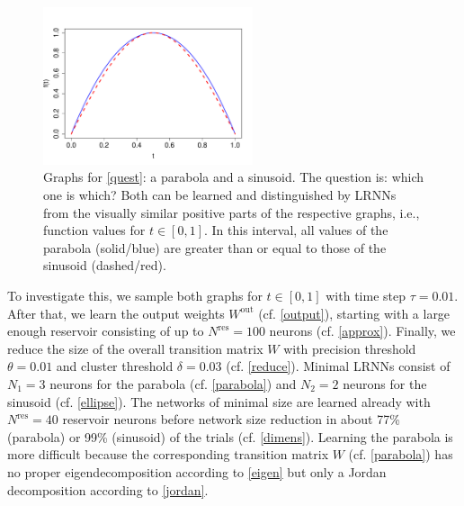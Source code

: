 \documentclass[twoside,11pt]{article}
\theoremstyle{definition}
\begin{document}
\begin{figure}
        \centering
	\includegraphics[width=0.55\textwidth]{fig/parasin2} %
	\caption{Graphs for \cref{quest}: a parabola and a sinusoid.
	The question is: which one is which? Both can be learned and
	distinguished by LRNNs from the visually similar positive parts of the
	respective graphs, i.e., function values for $t \in [0, 1]$. In this
	interval, all values of the parabola (solid/blue) are greater than or equal
	to those of the sinusoid (dashed/red).}
	\label{parasin}
\end{figure}

To investigate this, we sample both graphs for $t \in [0,1]$ with time step
$\tau=0.01$. After that, we learn the output weights $W^\mathrm{out}$ (cf.
\cref{output}), starting with a large enough reservoir consisting of up to
$N^\mathrm{res} = 100$ neurons (cf. \cref{approx}). Finally, we reduce the
size of the overall transition matrix $W$ with precision threshold $\theta =
0.01$ and cluster threshold $\delta = 0.03$ (cf. \cref{reduce}). Minimal LRNNs consist of $N_1 = 3$ neurons for
the parabola (cf. \cref{parabola}) and $N_2 = 2$ neurons for the sinusoid
(cf. \cref{ellipse}). The networks of minimal size are learned already with
$N^\mathrm{res} = 40$ reservoir neurons before network size reduction in about
77\% (parabola) or 99\% (sinusoid) of the trials (cf. \cref{dimens}).
Learning the parabola is more difficult because the corresponding transition
matrix $W$ (cf. \cref{parabola}) has no proper eigendecomposition according
to \cref{eigen} but only a Jordan decomposition according to \cref{jordan}.
\end{document}
